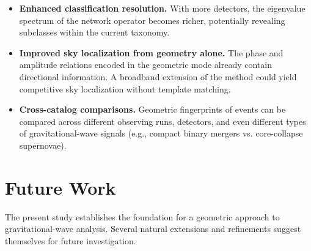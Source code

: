 \documentclass[11pt,a4paper]{article}
\begin{document}
\begin{itemize}
    \item \textbf{Enhanced classification resolution.} With more detectors, the eigenvalue spectrum of the network operator becomes richer, potentially revealing subclasses within the current taxonomy.

    \item \textbf{Improved sky localization from geometry alone.} The phase and amplitude relations encoded in the geometric mode already contain directional information. A broadband extension of the method could yield competitive sky localization without template matching.

    \item \textbf{Cross-catalog comparisons.} Geometric fingerprints of events can be compared across different observing runs, detectors, and even different types of gravitational-wave signals (e.g., compact binary mergers vs. core-collapse supernovae).
\end{itemize}

\section{Future Work}
\label{sec:future_work}

The present study establishes the foundation for a geometric approach to gravitational-wave analysis. Several natural extensions and refinements suggest themselves for future investigation.
\end{document}
